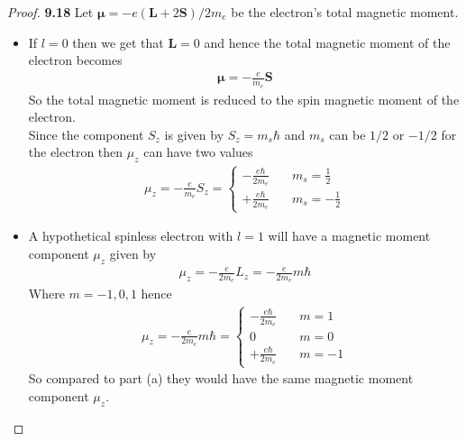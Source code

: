 \documentclass[11pt]{article}
\theoremstyle{definition}
\begin{document}
\cleardoublepage
\begin{proof}{\textbf{9.18}}
Let $\bm{\mu} = -e(\bm{L} + 2\bm{S})/2m_e$ be the electron's total magnetic
moment.
\begin{itemize}
\item [\textbf{(a)}] If $l = 0$ then we get that $\bm{L} = 0$ and hence the
total magnetic moment of the electron becomes 
\begin{align*}
    \bm{\mu} = -\frac{e}{m_e}\bm{S}
\end{align*}
So the total magnetic moment is reduced to the spin magnetic moment of the 
electron.
\\
Since the component $S_z$ is given by $S_z = m_s \hbar$ and $m_s$ can be $1/2$
or $-1/2$ for the electron then $\mu_z$ can have two values
\begin{align*}
    \mu_z = -\frac{e}{m_e}S_z = \begin{cases}
        -\frac{e\hbar}{2m_e} \quad &m_s = \frac{1}{2}\\[7pt]
        +\frac{e\hbar}{2m_e} \quad &m_s = -\frac{1}{2}
    \end{cases}
\end{align*}
\item [\textbf{(b)}] A hypothetical spinless electron with $l = 1$ will have
a magnetic moment component $\mu_z$ given by
\begin{align*}
    \mu_z = -\frac{e}{2m_e}L_z = -\frac{e}{2m_e}m \hbar
\end{align*}
Where $m = -1, 0, 1$ hence
\begin{align*}
    \mu_z =  -\frac{e}{2m_e}m \hbar = \begin{cases}
        -\frac{e\hbar}{2m_e} &\quad m = 1\\[7pt]
        0 &\quad m = 0\\[7pt]
        +\frac{e\hbar}{2m_e} &\quad m = -1
    \end{cases}
\end{align*}
So compared to part (a) they would have the same magnetic moment component
$\mu_z$.

\end{itemize}
\end{proof}
\end{document}
